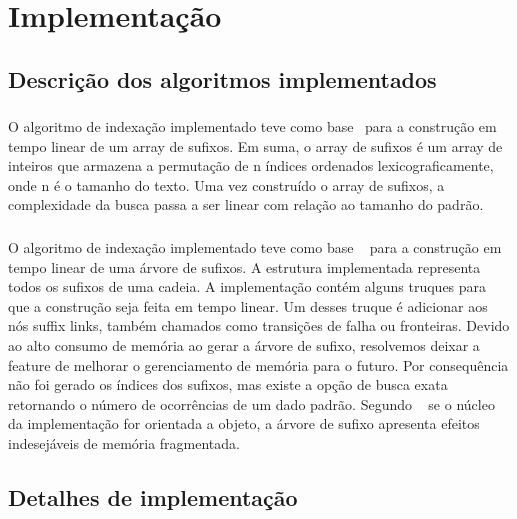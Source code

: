 \section{Implementação}

\subsection{Descrição dos algoritmos implementados}

\subsubsection{\lsa}
O algoritmo de indexação  implementado teve como
base~\cite{KarkkainenS03} para a construção em
tempo linear de um array de sufixos. Em suma, o array de sufixos é um array de
inteiros que armazena a permutação de n índices ordenados lexicograficamente,
onde n é o tamanho do texto. Uma vez construído o array de sufixos, a
complexidade da busca passa a ser linear com relação ao tamanho do padrão.

\subsubsection{\lst}
O algoritmo de indexação implementado teve como
base ~\cite{UkkonenST} para a construção em tempo linear
de uma árvore de sufixos. A estrutura implementada representa
todos os sufixos de uma cadeia. A implementação contém alguns truques
para que a construção seja feita em tempo linear. Um desses truque é adicionar aos
nós suffix links, também chamados como transições de falha ou fronteiras. Devido 
ao alto consumo de memória ao gerar a árvore de sufixo, resolvemos deixar a feature
de melhorar o gerenciamento de memória para o futuro. Por consequência não foi gerado os índices dos sufixos, mas existe a opção de busca exata retornando o número de ocorrências de um dado padrão. Segundo ~\cite{BogdanCraig} se o núcleo da implementação for orientada a objeto, a árvore de sufixo apresenta efeitos indesejáveis
de memória fragmentada.

\subsubsection{\lz}


\subsection{Detalhes de implementação}
